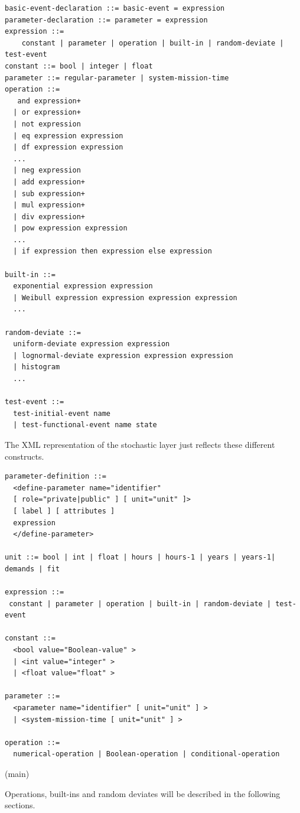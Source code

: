 \documentclass[11pt]{article}
\begin{document}
\lstset{language=[LaTeX]TeX,label= ,caption= ,captionpos=b,numbers=none}
\begin{lstlisting}
basic-event-declaration ::= basic-event = expression
parameter-declaration ::= parameter = expression
expression ::=
    constant | parameter | operation | built-in | random-deviate | test-event
constant ::= bool | integer | float
parameter ::= regular-parameter | system-mission-time
operation ::=
   and expression+
  | or expression+
  | not expression
  | eq expression expression
  | df expression expression
  ...
  | neg expression
  | add expression+
  | sub expression+
  | mul expression+
  | div expression+
  | pow expression expression
  ...
  | if expression then expression else expression

built-in ::=
  exponential expression expression
  | Weibull expression expression expression expression
  ...

random-deviate ::=
  uniform-deviate expression expression
  | lognormal-deviate expression expression expression
  | histogram
  ...

test-event ::=
  test-initial-event name
  | test-functional-event name state
\end{lstlisting}

The XML representation of the stochastic layer just reflects these
different constructs.

\begin{lstlisting}
parameter-definition ::=
  <define-parameter name="identifier"
  [ role="private|public" ] [ unit="unit" ]>
  [ label ] [ attributes ]
  expression
  </define-parameter>

unit ::= bool | int | float | hours | hours-1 | years | years-1| demands | fit

expression ::=
 constant | parameter | operation | built-in | random-deviate | test-event

constant ::=
  <bool value="Boolean-value" >
  | <int value="integer" >
  | <float value="float" >

parameter ::=
  <parameter name="identifier" [ unit="unit" ] >
  | <system-mission-time [ unit="unit" ] >

operation ::=
  numerical-operation | Boolean-operation | conditional-operation
\end{lstlisting}

(main)

Operations, built-ins and random deviates will be described in the
following sections.
\end{document}
